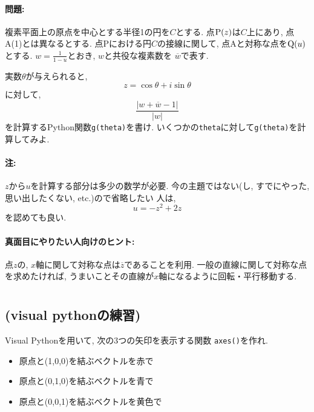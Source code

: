 \documentclass[10pt,dvipdfmx]{article}
\begin{document}
\paragraph{問題:}
複素平面上の原点を中心とする半径1の円を$C$とする.
点${\rm P}(z)$は$C$上にあり, 点A(1)とは異なるとする.
点Pにおける円$C$の接線に関して, 点Aと対称な点を${\rm Q}(u)$とする.
${\displaystyle w = \frac{1}{1-u}}$とおき, $w$と共役な複素数を
$\overline{w}$で表す.

実数$\theta$が与えられると, 
\[ z = \cos\theta + i \sin\theta \]
に対して,
\[ \frac{| w + \overline{w} - 1|}{|w|} \]
を計算するPython関数{\tt g(theta)}を書け.
いくつかの{\tt theta}に対して{\tt g(theta)}を計算してみよ.

\paragraph{注:} $z$から$u$を計算する部分は多少の数学が必要. 
今の主題ではない(し, すでにやった, 思い出したくない, etc.)ので省略したい
人は,
\[ u = -z^2 + 2z \]
を認めても良い.

\paragraph{真面目にやりたい人向けのヒント:}
点$z$の, $x$軸に関して対称な点は$\overline{z}$であることを利用.
一般の直線に関して対称な点を求めたければ,
うまいことその直線が$x$軸になるように回転・平行移動する.

\newpage
\section{}

\subsection{{\scriptsize (visual pythonの練習)}}
Visual Pythonを用いて, 次の3つの矢印を表示する関数
{\tt axes()}を作れ. 
\begin{itemize}
\item 原点と(1,0,0)を結ぶベクトルを赤で
\item 原点と(0,1,0)を結ぶベクトルを青で
\item 原点と(0,0,1)を結ぶベクトルを黄色で
\end{itemize}
\end{document}

